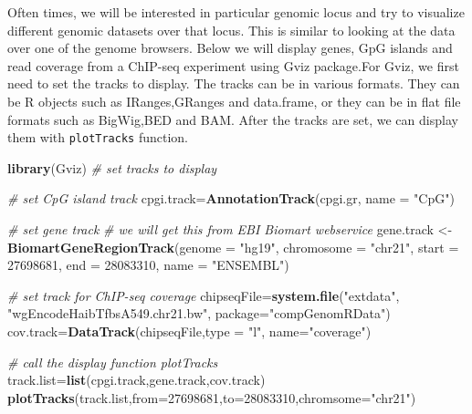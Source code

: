 \documentclass[12pt,]{krantz}
\newenvironment{Shaded}{\begin{snugshade}}{\end{snugshade}}
\newcommand{\CommentTok}[1]{\textcolor[rgb]{0.56,0.35,0.01}{\textit{#1}}}
\newcommand{\DataTypeTok}[1]{\textcolor[rgb]{0.13,0.29,0.53}{#1}}
\newcommand{\DecValTok}[1]{\textcolor[rgb]{0.00,0.00,0.81}{#1}}
\newcommand{\KeywordTok}[1]{\textcolor[rgb]{0.13,0.29,0.53}{\textbf{#1}}}
\newcommand{\NormalTok}[1]{#1}
\newcommand{\StringTok}[1]{\textcolor[rgb]{0.31,0.60,0.02}{#1}}
\begin{document}
Often times, we will be interested in particular genomic locus and try to visualize
different genomic datasets over that locus. This is similar to looking at the data
over one of the genome browsers. Below we will display genes, GpG islands and read
coverage from a ChIP-seq experiment using Gviz package.For Gviz, we first need to
set the tracks to display. The tracks can be in various formats. They can be R
objects such as IRanges,GRanges and data.frame, or they can be in flat file formats
such as BigWig,BED and BAM. After the tracks are set, we can display them with
\texttt{plotTracks} function.

\begin{Shaded}
\begin{Highlighting}[]
\KeywordTok{library}\NormalTok{(Gviz)}
\CommentTok{# set tracks to display}

\CommentTok{# set CpG island track}
\NormalTok{cpgi.track=}\KeywordTok{AnnotationTrack}\NormalTok{(cpgi.gr,}
                           \DataTypeTok{name =} \StringTok{"CpG"}\NormalTok{)}

\CommentTok{# set gene track}
\CommentTok{# we will get this from EBI Biomart webservice}
\NormalTok{gene.track <-}\StringTok{ }\KeywordTok{BiomartGeneRegionTrack}\NormalTok{(}\DataTypeTok{genome =} \StringTok{"hg19"}\NormalTok{,}
                                    \DataTypeTok{chromosome =} \StringTok{"chr21"}\NormalTok{, }
                                    \DataTypeTok{start =} \DecValTok{27698681}\NormalTok{, }\DataTypeTok{end =} \DecValTok{28083310}\NormalTok{,}
                                    \DataTypeTok{name =} \StringTok{"ENSEMBL"}\NormalTok{)}


\CommentTok{# set track for ChIP-seq coverage}
\NormalTok{chipseqFile=}\KeywordTok{system.file}\NormalTok{(}\StringTok{"extdata"}\NormalTok{,}
                      \StringTok{"wgEncodeHaibTfbsA549.chr21.bw"}\NormalTok{,}
                      \DataTypeTok{package=}\StringTok{"compGenomRData"}\NormalTok{)}
\NormalTok{cov.track=}\KeywordTok{DataTrack}\NormalTok{(chipseqFile,}\DataTypeTok{type =} \StringTok{"l"}\NormalTok{,}
                    \DataTypeTok{name=}\StringTok{"coverage"}\NormalTok{)}
  
\CommentTok{# call the display function plotTracks}
\NormalTok{track.list=}\KeywordTok{list}\NormalTok{(cpgi.track,gene.track,cov.track)}
\KeywordTok{plotTracks}\NormalTok{(track.list,}\DataTypeTok{from=}\DecValTok{27698681}\NormalTok{,}\DataTypeTok{to=}\DecValTok{28083310}\NormalTok{,}\DataTypeTok{chromsome=}\StringTok{"chr21"}\NormalTok{)}
\end{Highlighting}
\end{Shaded}
\end{document}
